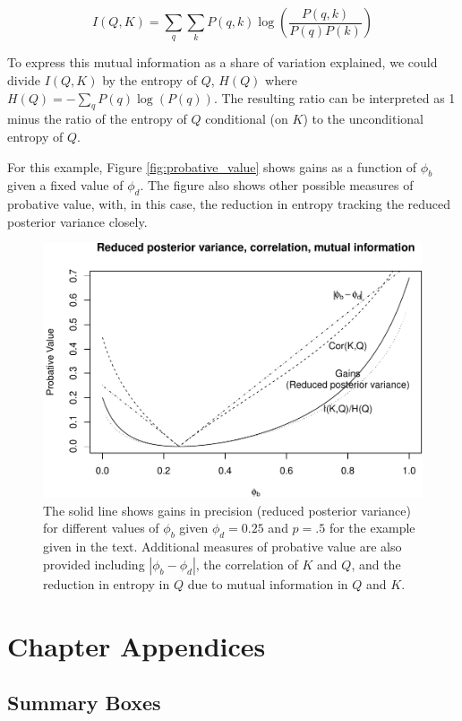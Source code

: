 \documentclass[
  12pt,
]{book}
\begin{document}
\[I(Q,K) = \sum_q \sum_k P(q,k)\log\left(\frac{P(q,k)}{P(q)P(k)}\right)\]

To express this mutual information as a share of variation explained, we could divide \(I(Q,K)\) by the entropy of \(Q\), \(H(Q)\) where \(H(Q) = -\sum_qP(q)\log(P(q))\). The resulting ratio can be interpreted as 1 minus the ratio of the entropy of \(Q\) conditional (on \(K\)) to the unconditional entropy of \(Q\).

For this example, Figure \ref{fig:probative_value} shows gains as a function of \(\phi_b\) given a fixed value of \(\phi_d\). The figure also shows other possible measures of probative value, with, in this case, the reduction in entropy tracking the reduced posterior variance closely.

\begin{figure}

{\centering \includegraphics[width=.7\textwidth]{ii_files/figure-latex/probativevalue-1} 

}

\caption{\label{fig:probative_value} The solid line shows gains in precision (reduced posterior variance) for different values of $\phi_b$ given $\phi_d=0.25$ and $p=.5$ for the example given in the text. Additional measures of probative value are also provided including $|\phi_b - \phi_d|$, the correlation of $K$ and $Q$, and the reduction in entropy in $Q$ due to mutual information in $Q$ and $K$.}\label{fig:probativevalue}
\end{figure}

\hypertarget{chapter-appendices}{%
\section{Chapter Appendices}\label{chapter-appendices}}

\hypertarget{summary-boxes}{%
\subsection{Summary Boxes}\label{summary-boxes}}
\end{document}
